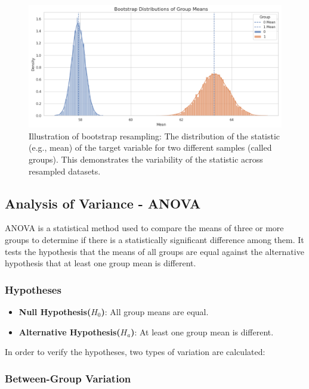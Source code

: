 \begin{center}
\begin{figure}[H]
  \centering
  \includegraphics[width=5in]{img/bootstrap.jpg}
  \caption{Illustration of bootstrap resampling: The distribution of the
  statistic (e.g., mean) of the target variable for two different samples
(called groups). This demonstrates the variability of the statistic across
resampled datasets.}
  \label{Figure:fig_beh}
\end{figure}
\end{center}

\subsection{Analysis of Variance - ANOVA}
ANOVA is a statistical method used to compare the means of three or more groups
to determine if there is a statistically significant difference among them. It
tests the hypothesis that the means of all groups are equal against the
alternative hypothesis that at least one group mean is different.

\subsubsection*{Hypotheses}
\begin{itemize}
  \item \textbf{Null Hypothesis($H_0$)}: All group means are equal.
  \item \textbf{Alternative Hypothesis($H_a$)}: At least one group mean is
    different.
\end{itemize}

\noindent \noindent In order to verify the hypotheses, two types of variation are calculated:

\subsubsection*{Between-Group Variation}

